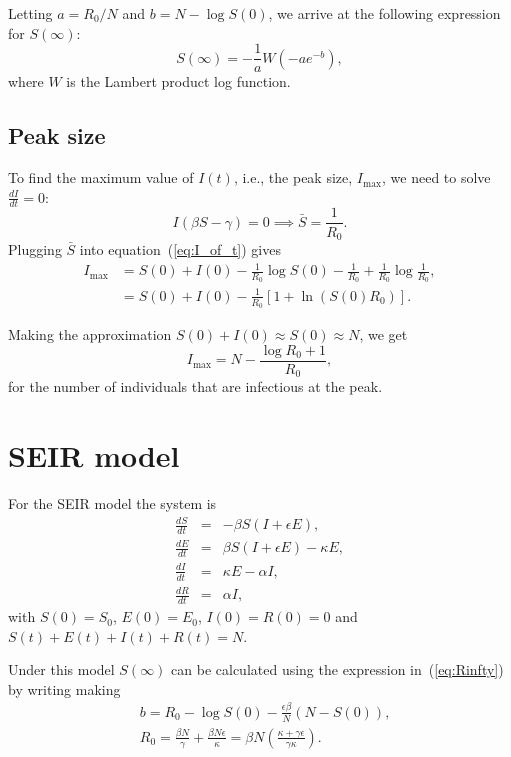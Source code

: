 \documentclass[a4paper, notitlepage, 10pt]{article}
\begin{document}
Letting $a = R_0/N$ and $b = N - \log S(0)$, we arrive at the following expression for $S(\infty)$:
\begin{equation}
\label{eq:Rinfty}
    S(\infty) = -\frac{1}{a} W\left(- a e^{-b} \right),
\end{equation}
where $W$ is the Lambert product log function.

\subsection*{Peak size}

To find the maximum value of $I(t)$, i.e., the peak size, $I_{\max}$, we need to solve $\frac{dI}{dt} = 0$:
\begin{equation}
 I(\beta S - \gamma) = 0 \implies \bar{S} = \frac{1}{R_0}.
\end{equation}
Plugging $\bar{S}$ into equation~(\ref{eq:I_of_t}) gives
\begin{align}
\label{eq:Imax}
    I_{\max} &= S(0) + I(0)-\frac{1}{R_0} \log S(0) - \frac{1}{R_0} + \frac{1}{R_0} \log \frac{1}{R_0},\\
    &= S(0) + I(0) - \frac{1}{R_0} \left[1 + \ln(S(0)R_0)\right].
\end{align}

Making the approximation $S(0) + I(0) \approx S(0) \approx N$, we get
\begin{equation}
 \label{eq:approx_Imax}
I_{\max} =  N - \frac{\log R_0 + 1}{R_0}, 
\end{equation}
for the number of individuals that are infectious at the peak.

\section*{SEIR model}

For the SEIR model the system is
\begin{eqnarray*}
\frac{dS}{dt}&=& -\beta S (I +\epsilon E),\\
\frac{dE}{dt}&=& \beta S (I +\epsilon E) - \kappa E,\\
\frac{dI}{dt}&=& \kappa E - \alpha I,\\
\frac{dR}{dt}&=& \alpha I, 
\end{eqnarray*} 
with $S(0) = S_0$, $E(0) = E_0$, $I(0) = R(0) = 0$ and $S(t) + E(t) + I(t) + R(t) = N$.

Under this model $S(\infty)$ can be calculated using the expression in~(\ref{eq:Rinfty}) by writing making
\begin{align}
 &b  = R_0 - \log S(0) -\frac{\epsilon\beta}{N}(N-S(0)),\\  &R_0 = \frac{\beta N}{\gamma} + \frac{\beta N\epsilon}{\kappa} = \beta N \left( \frac{\kappa + \gamma\epsilon}{\gamma\kappa}\right).
\end{align}
\end{document}
